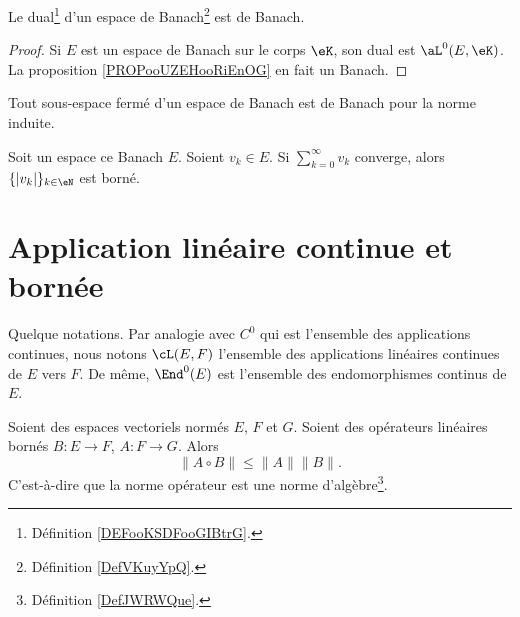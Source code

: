 \begin{proposition}     \label{PROPooOVGGooNffWJW}
	Le dual\footnote{Définition \ref{DEFooKSDFooGIBtrG}.} d'un espace de Banach\footnote{Définition \ref{DefVKuyYpQ}.} est de Banach.
\end{proposition}

\begin{proof}
	Si \( E\) est un espace de Banach sur le corps \( \eK\), son dual est \( \aL^0(E,\eK)\). La proposition \ref{PROPooUZEHooRiEnOG} en fait un Banach.
\end{proof}

\begin{proposition}	\label{PROPooUNVAooRDxkyI}
	Tout sous-espace fermé d'un espace de Banach est de Banach pour la norme induite.
\end{proposition}

\begin{proposition}	\label{PROPooAPVCooFyMigL}
	Soit un espace ce Banach \( E\). Soient \( v_k\in E\). Si \( \sum_{k=0}^{\infty}v_k\) converge, alors \( \{ | v_k | \}_{k\in \eN} \) est borné.
\end{proposition}

\section{Application linéaire continue et bornée}

\begin{normaltext}		\label{NORMooUKURooIkcRoS}
	Quelque notations. Par analogie avec \( C^0\) qui est l'ensemble des applications continues, nous notons \( \cL(E,F)\) l'ensemble des applications linéaires continues de \( E\) vers \( F\). De même, \( \End^0(E)\) est l'ensemble des endomorphismes continus de \( E\).
\end{normaltext}


\begin{lemma}   \label{LEMooFITMooBBBWGI}
	Soient des espaces vectoriels normés \( E\), \( F\) et \( G\). Soient des opérateurs linéaires bornés \( B\colon E\to F\), \( A\colon F\to G\). Alors
	\begin{equation}
		\| A\circ B \|\leq \| A \|\| B \|.
	\end{equation}
	C'est-à-dire que la norme opérateur est une norme d'algèbre\footnote{Définition \ref{DefJWRWQue}.}.
\end{lemma}

